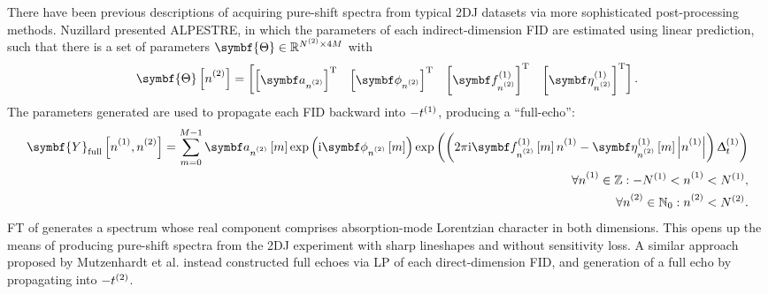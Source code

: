 There have been previous descriptions of acquiring pure-shift spectra from
typical \ac{2DJ} datasets via more sophisticated post-processing methods.
Nuzillard presented \ac{ALPESTRE}\cite{Nuzillard1996}, in which the parameters
of each indirect-dimension FID are estimated using linear prediction, such that
there is a set of parameters $\symbf{\Theta} \in \mathbb{R}^{\Ntwo \times 4M}$
with
\begin{equation}
    \symbf{\Theta}\left[\ntwo\right] =
    \begin{bmatrix}
        \left[\bda_{\ntwo}\right]\T &
        \left[\bdphi_{\ntwo}\right]\T &
        \left[\bdfone_{\ntwo}\right]\T &
        \left[\bdetaone_{\ntwo}\right]\T
    \end{bmatrix}.
\end{equation}
The parameters generated are used to propagate each FID backward into
$-t^{(1)}$, producing a ``full-echo'':
\begin{equation}
    \begin{split}
        \symbf{Y}_{\text{full}}\left[\none, \ntwo\right] = \sum_{m=0}^{M-1}
            \bda_{\ntwo} \left[ m \right]
            \exp\left(\iu \bdphi_{\ntwo} \left[ m \right] \right)
            \exp\left(\left(2 \pi \iu \bdfone_{\ntwo} \left[ m \right] \none
            -\bdetaone_{\ntwo} \left[ m \right] \left\lvert \none \right\rvert \right)\Dtone\right) \\
        \forall \none \in \mathbb{Z}: -\None < \none < \None,\\ \forall \ntwo \in \mathbb{N}_0: \ntwo < \Ntwo.
    \end{split}
\end{equation}
\ac{FT} of generates a spectrum whose real component comprises absorption-mode
Lorentzian character in both dimensions. This opens up the means of producing
pure-shift spectra from the \ac{2DJ} experiment with sharp lineshapes and
without sensitivity loss. A similar approach proposed by Mutzenhardt et al.
instead constructed full echoes via \ac{LP} of each direct-dimension
\ac{FID}, and generation of a full echo by propagating
into $-t^{(2)}$\cite{Mutzenhardt1999}.

